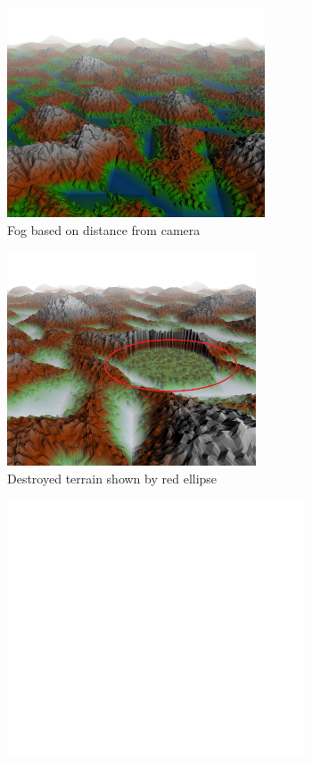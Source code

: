 \documentclass[annual]{acmsiggraph}
\begin{document}
\begin{figure}[]
  \centering
  \includegraphics[height=2.45in]{images/Terrain_FogDepth1.png}
  \caption{Fog based on distance from camera}
  \label{fig:fogDepth}
\end{figure}

\begin{figure}[t]
  \includegraphics[height=2.5in]{images/Destroy1.png}
  \caption{Destroyed terrain shown by red ellipse}
  \label{fig:destroy}
\end{figure}

\begin{figure}[t]
  \includegraphics[height=3in]{images/Blank.png}
\end{figure}
\end{document}
